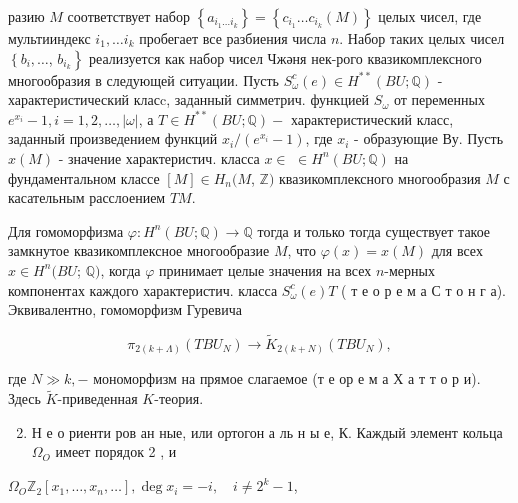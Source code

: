 \documentclass[10pt]{article}
\begin{document}
разию $M$ соответствует набор $\left\{a_{i_{1} \ldots i_{k}}\right\}=\left\{c_{i_{1}} \ldots c_{i_{k}}(M)\right\}$ целых чисел, где мультииндекс $i_{1}, \ldots i_{k}$ пробегает все разбиения числа $n$. Набор таких целых чисел $\left\{b_{i}, \ldots\right.$, $\left.b_{i_{k}}\right\}$ реализуется как набор чисел Чжәня нек-рого квазикомплексного многообразия в следующей ситуации. Пусть $S_{\omega}^{c}(e) \in H^{* *}(B U ; \mathbb{Q})$ - характеристический класc, заданный симметрич. функцией $S_{\omega}$ от переменных $e^{x_{i}}-1, i=1,2, \ldots,|\omega|$, а $T \in H^{* *}(B U ; \mathbb{Q})-$ характеристический класс, заданный произведением функций $x_{i} /\left(e^{x_{i}}-1\right)$, где $x_{i}$ - образующие Ву. Пусть $x(M)$ - значение характеристич. класса $x \in$ $\in H^{n}(B U ; \mathbb{Q})$ на фундаментальном классе $[M] \in H_{n}(M$, $\mathbb{Z})$ квазикомплексного многообразия $M$ с касательным расслоением $T M$.



Для гомоморфизма $\varphi: H^{n}(B U ; \mathbb{Q}) \rightarrow \mathbb{Q}$ тогда и только тогда существует такое замкнутое квазикомплексное многообразие $M$, что $\varphi(x)=x(M)$ для всех $x \in H^{n}(B U$; $\mathbb{Q})$, когда $\varphi$ принимает целые значения на всех $n$-мерных компонентах каждого характеристич. класса $S_{\omega}^{c}(e) T$ ( т е о р е м а С т о н г а). Эквивалентно, гомоморфизм Гуревича



\[

\pi_{2(k+\Lambda)}\left(T B U_{N}\right) \rightarrow \tilde{K}_{2(k+N)}\left(T B U_{N}\right),

\]



где $N \gg k,-$ мономорфизм на прямое слагаемое (т е ор е м а Х а т т о р и). Здесь $\tilde{K}$-приведенная $K$-теория.



\begin{enumerate}

  \setcounter{enumi}{1}

  \item Н е о риенти ров ан ные, или ортогон а ль н ы е, К. Каждый элемент кольца $\Omega_{O}$ имеет порядок 2 , и

\end{enumerate}



$\Omega_{O} \mathbb{Z}_{2}\left[x_{1}, \ldots, x_{n}, \ldots\right], \operatorname{deg} x_{i}=-i, \quad i \neq 2^{k}-1$,
\end{document}
